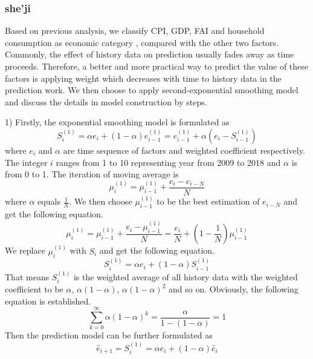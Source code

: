\documentclass{apmcmthesis}
\begin{document}
\subsubsection{she'ji}
\hspace{2em}Based on previous analysis, we classify CPI, GDP, FAI and household consumption as economic category , compared with the other two factors. Commonly, the effect of history data on prediction usually fades away as time proceeds. Therefore, a better and more practical way to predict the value of these factors is applying weight which decreases with time to history data in the prediction work. We then choose to apply second-exponential smoothing model and discuss the details in model construction by steps.

1) Firstly, the exponential smoothing model is formulated as 
\begin{equation}
S_{i}^{(1)}=\alpha {{e}_{i}}+(1-\alpha )e_{i-1}^{(1)}=e_{i-1}^{(1)}+\alpha ({{e}_{i}}-S_{i-1}^{(1)})
\end{equation}
where $e_i$ and $\alpha$ are time sequence of factors and weighted coefficient respectively. The integer $i$ ranges from 1 to 10 representing year from 2009 to 2018 and $\alpha$ is from 0 to 1. The iteration of moving average is 
\begin{equation}
\mu _{i}^{(1)}=\mu _{i-1}^{(1)}+\frac{{{e}_{i}}-{{e}_{i-N}}}{N}
\end{equation}
where $\alpha$ equals $\frac{1}{N}$. We then choose $\mu _{i-1}^{(1)}$ to be the best estimation of $e_{i-N}$ and get the following equation.
\begin{equation}
\mu _{i}^{(1)}=\mu _{i-1}^{(1)}+\frac{{{e}_{i}}-\mu _{i-1}^{(1)}}{N}=\frac{{{e}_{i}}}{N}+(1-\frac{1}{N})\mu _{i-1}^{(1)}
\end{equation}
We replace $\mu _{i}^{(1)}$ with $S_i$ and get the following equation.
\begin{equation}
S_{i}^{(1)}=\alpha {{e}_{i}}+(1-\alpha )S_{i-1}^{(1)}
\end{equation}
That means $S_i^{(1)}$ is the weighted average of all history data with the weighted coefficient to be $\alpha$, $\alpha(1-\alpha)$, $\alpha(1-\alpha)^2$ and so on. Obviously, the following equation is established.
\begin{equation}
{{\sum\limits_{k=0}^{\infty }{\alpha (1-\alpha )^{k}}}}=\frac{\alpha }{1-(1-\alpha )}=1
\end{equation}
Then the prediction model can be further formulated as
\begin{equation}
{{\hat{e}}_{i+1}}=S_{i}^{(1)}=\alpha {{e}_{i}}+(1-\alpha ){{\hat{e}}_{i}}
\end{equation}
\end{document}
